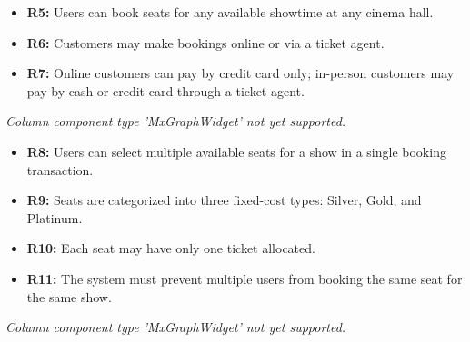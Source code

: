 \noindent
\begin{minipage}[t]{0.48\textwidth}\vspace{0pt}
\begin{itemize}
\item
\textbf{R5:} Users can book seats for any available showtime at any cinema hall.
\item
\textbf{R6:} Customers may make bookings online or via a ticket agent.
\item
\textbf{R7:} Online customers can pay by credit card only; in-person customers may pay by cash or credit card through a ticket agent.
\end{itemize}
\end{minipage}
\hfill
\begin{minipage}[t]{0.48\textwidth}\vspace{0pt}
\textit{Column component type 'MxGraphWidget' not yet supported.}
\end{minipage}

\noindent
\begin{minipage}[t]{0.48\textwidth}\vspace{0pt}
\begin{itemize}
\item
\textbf{R8:} Users can select multiple available seats for a show in a single booking transaction.
\item
\textbf{R9:} Seats are categorized into three fixed-cost types: Silver, Gold, and Platinum.
\item
\textbf{R10:} Each seat may have only one ticket allocated.
\item
\textbf{R11:} The system must prevent multiple users from booking the same seat for the same show.
\end{itemize}
\end{minipage}
\hfill
\begin{minipage}[t]{0.48\textwidth}\vspace{0pt}
\textit{Column component type 'MxGraphWidget' not yet supported.}
\end{minipage}

